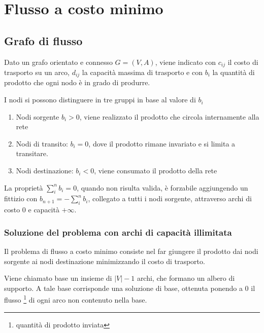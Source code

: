 \documentclass[../template]{subfiles}
\begin{document}
\section{Flusso a costo minimo}
\subsection{Grafo di flusso}
Dato un grafo orientato e connesso $G = (V, A)$, viene indicato con $c_{ij}$ il costo di trasporto su un arco, $d_{ij}$ la
capacità massima di trasporto e con $b_{i}$ la quantità di prodotto che ogni nodo è in grado di produrre.

I nodi si possono distinguere in tre gruppi in base al valore di $b_i$
\begin{enumerate}
    \item Nodi sorgente $b_i > 0$, viene realizzato il prodotto che circola internamente alla rete
    \item Nodi di transito: $b_i = 0$, dove il prodotto rimane invariato e si limita a transitare.
    \item Nodi destinazione: $b_i < 0$, viene consumato il prodotto della rete
\end{enumerate}
La proprietà $\sum_i^n b_i = 0$, quando non risulta valida, è forzabile aggiungendo un fittizio
con $b_{n+1} = -\sum_i^n b_i$, collegato a tutti i nodi sorgente, attraverso archi di costo 0 e capacità $+\infty$.

\subsubsection{Soluzione del problema con archi di capacità illimitata}
Il problema di flusso a costo minimo consiste nel far giungere il prodotto dai nodi sorgente ai nodi destinazione
minimizzando il costo di trasporto.

Viene chiamato base un insieme di $|V| - 1$ archi, che formano un albero di supporto.
A tale base corrisponde una soluzione di base, ottenuta ponendo a 0 il flusso \footnote{quantità di prodotto inviata}
di ogni arco non contenuto nella base.
\end{document}
